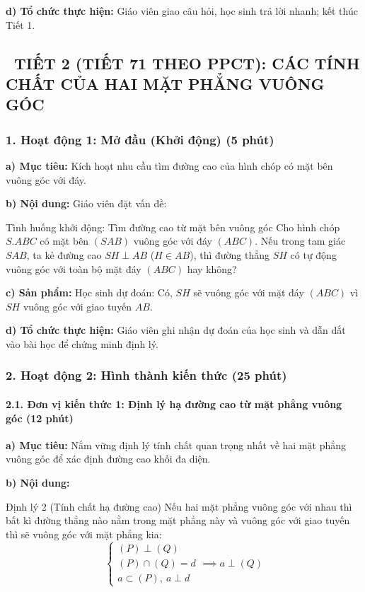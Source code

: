 \documentclass[12pt, a4paper]{article}
\begin{document}
\noindent \textbf{d) Tổ chức thực hiện:}
Giáo viên giao câu hỏi, học sinh trả lời nhanh; kết thúc Tiết 1.

\vspace{10pt}

\subsection*{\faClockO \ TIẾT 2 (TIẾT 71 THEO PPCT): CÁC TÍNH CHẤT CỦA HAI MẶT PHẲNG VUÔNG GÓC}

\subsubsection*{1. Hoạt động 1: Mở đầu (Khởi động) (5 phút)}

\noindent \textbf{a) Mục tiêu:}
Kích hoạt nhu cầu tìm đường cao của hình chóp có mặt bên vuông góc với đáy.

\noindent \textbf{b) Nội dung:}
Giáo viên đặt vấn đề:
\begin{pedabox}{Tình huống khởi động: Tìm đường cao từ mặt bên vuông góc}
Cho hình chóp $S.ABC$ có mặt bên $(SAB)$ vuông góc với đáy $(ABC)$.
Nếu trong tam giác $SAB$, ta kẻ đường cao $SH \perp AB$ ($H \in AB$), thì đường thẳng $SH$ có tự động vuông góc với toàn bộ mặt đáy $(ABC)$ hay không?
\end{pedabox}

\noindent \textbf{c) Sản phẩm:}
Học sinh dự đoán: Có, $SH$ sẽ vuông góc với mặt đáy $(ABC)$ vì $SH$ vuông góc với giao tuyến $AB$.

\noindent \textbf{d) Tổ chức thực hiện:}
Giáo viên ghi nhận dự đoán của học sinh và dẫn dắt vào bài học để chứng minh định lý.

\subsubsection*{2. Hoạt động 2: Hình thành kiến thức (25 phút)}

\paragraph{2.1. Đơn vị kiến thức 1: Định lý hạ đường cao từ mặt phẳng vuông góc (12 phút)}

\noindent \textbf{a) Mục tiêu:}
Nắm vững định lý tính chất quan trọng nhất về hai mặt phẳng vuông góc để xác định đường cao khối đa diện.

\noindent \textbf{b) Nội dung:}
\begin{pedabox}{Định lý 2 (Tính chất hạ đường cao)}
Nếu hai mặt phẳng vuông góc với nhau thì bất kì đường thẳng nào nằm trong mặt phẳng này và vuông góc với giao tuyến thì sẽ vuông góc với mặt phẳng kia:
$$\begin{cases} (P) \perp (Q) \\ (P) \cap (Q) = d \\ a \subset (P), \ a \perp d \end{cases} \implies a \perp (Q)$$
\end{pedabox}
\end{document}
